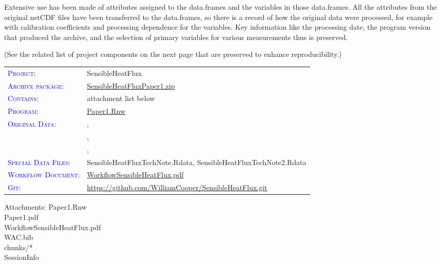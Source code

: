 \documentclass[11pt,twoside,american,12pt,twoside,american]{article}\usepackage[]{graphicx}\usepackage[]{color}
\providecommand{\tabularnewline}{\\}
\let\OrgIndex\index
\renewcommand*{\index}[1]{\OrgIndex{#1}}
\newenvironment{lylist}[1]{\begin{list}{}
{\settowidth{\labelwidth}{#1}
\setlength{\leftmargin}{\labelwidth}
\addtolength{\leftmargin}{\labelsep}
\renewcommand{\makelabel}[1]{##1\hfil}}}{\end{list}}
\newcommand{\attachm}[1]{\begin{lylist}{Attachments:00}
\item [Attachments:] {#1}
\end{lylist}}
\begin{document}
Extensive use has been made of attributes
assigned to the data.frames and the variables in those data.frames.
All the attributes from the original netCDF files
have been transferred to the data.frames, so there is a record of
how the original data were processed, for example with calibration
coefficients and processing dependence for the variables. Key information
like the processing date, the program version that produced the archive,
and the selection of primary variables for various measurements thus
is preserved.

(See the related list of project components on the next page that
are preserved to enhance reproducibility.)

\clearpage{}

\begin{tabular}{ll}
\textsf{\textsc{\textcolor{blue}{Project:}}} &
SensibleHeatFlux\tabularnewline
\textsf{\textsc{\textcolor{blue}{Archive package:}}} &
\href{https://github.com/WilliamCooper/SensibleHeatFlux/blob/master/SensibleHeatFluxPaper1.zip}{SensibleHeatFluxPaper1.zip}\tabularnewline
\textsf{\textsc{\textcolor{blue}{Contains:}}} &
attachment list below\tabularnewline
\textsf{\textsc{\textcolor{blue}{Program:}}} &
\href{https://github.com/WilliamCooper/SensibleHeatFlux/blob/master/Paper1.Rnw}{Paper1.Rnw}\tabularnewline
\textsf{\textsc{\textcolor{blue}{Original Data:}}} &
\citet{VOCALS2011}, \tabularnewline
 &
\citet{CSET2017},\tabularnewline
 &
,\citet{SOCRATES2019}\tabularnewline
\textsf{\textsc{\textcolor{blue}{Special Data Files:}}} &
SensibleHeatFluxTechNote.Rdata, SensibleHeatFluxTechNote2.Rdata\tabularnewline
\textsf{\textsc{\textcolor{blue}{Workflow Document:}}} &
\href{https://github.com/WilliamCooper/SensibleHeatFlux/blob/master/WorkflowSensibleHeatFlux.pdf}{WorkflowSensibleHeatFlux.pdf}\tabularnewline
\textsf{\textsc{\textcolor{blue}{Git:}}} &
\index{GitHub repository}\href{https://github.com/WilliamCooper/SensibleHeatFlux.git}{https://github.com/WilliamCooper/SensibleHeatFlux.git}\tabularnewline
\end{tabular}

\attachm{Paper1.Rnw\\
Paper1.pdf\\
WorkflowSensibleHeatFlux.pdf\\
WAC.bib\\
chunks/{*}\\
SessionInfo}

\label{sec:bibliography}



\clearpage{}

\end{document}
